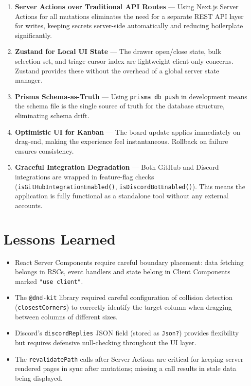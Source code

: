 \documentclass[12pt,a4paper]{report}
\begin{document}
\begin{enumerate}
  \item \textbf{Server Actions over Traditional API Routes} --- Using Next.js
    Server Actions for all mutations eliminates the need for a separate
    REST API layer for writes, keeping secrets server-side automatically and
    reducing boilerplate significantly.
  \item \textbf{Zustand for Local UI State} --- The drawer open/close state,
    bulk selection set, and triage cursor index are lightweight client-only
    concerns.  Zustand provides these without the overhead of a global server
    state manager.
  \item \textbf{Prisma Schema-as-Truth} --- Using \texttt{prisma db push} in
    development means the schema file is the single source of truth for the
    database structure, eliminating schema drift.
  \item \textbf{Optimistic UI for Kanban} --- The board update applies
    immediately on drag-end, making the experience feel instantaneous.
    Rollback on failure ensures consistency.
  \item \textbf{Graceful Integration Degradation} --- Both GitHub and Discord
    integrations are wrapped in feature-flag checks
    (\texttt{isGitHubIntegrationEnabled()},
    \texttt{isDiscordBotEnabled()}).  This means the application is
    fully functional as a standalone tool without any external accounts.
\end{enumerate}

\section{Lessons Learned}

\begin{itemize}
  \item React Server Components require careful boundary placement: data
    fetching belongs in RSCs, event handlers and state belong in Client
    Components marked \texttt{"use client"}.
  \item The \texttt{@dnd-kit} library required careful configuration of
    collision detection (\texttt{closestCorners}) to correctly identify the
    target column when dragging between columns of different sizes.
  \item Discord's \texttt{discordReplies} JSON field (stored as
    \texttt{Json?}) provides flexibility but requires defensive null-checking
    throughout the UI layer.
  \item The \texttt{revalidatePath} calls after Server Actions are critical for
    keeping server-rendered pages in sync after mutations; missing a call
    results in stale data being displayed.
\end{itemize}
\end{document}
